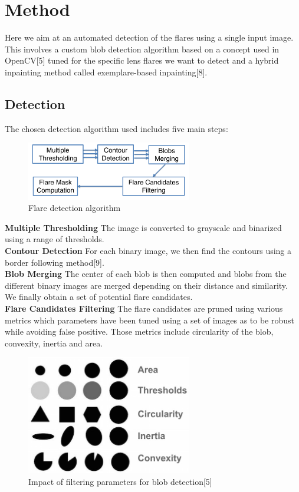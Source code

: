\documentclass[11pt,twocolumn]{article}
\begin{document}
\section{Method}

Here we aim at an automated detection of the flares using a single input image. This involves a custom blob detection algorithm based on a concept used in OpenCV[5] tuned for the specific lens flares we want to detect and a hybrid inpainting method called exemplare-based inpainting[8].

\subsection{Detection}

The chosen detection algorithm used includes five main steps:
\\

\begin{figure}[ht!]
\centering
\includegraphics[width=72mm]{flow_detection.png}
\caption{Flare detection algorithm}
\end{figure}

\textbf{Multiple Thresholding} The image is converted to grayscale and binarized using a range of thresholds.
\\

\textbf{Contour Detection} For each binary image, we then find the contours using a border following method[9].
\\

\textbf{Blob Merging} The center of each blob is then computed and blobs from the different binary images are merged depending on their distance and similarity. We finally obtain a set of potential flare candidates.
\\

\textbf{Flare Candidates Filtering} The flare candidates are pruned using various metrics which parameters have been tuned using a set of images as to be robust while avoiding false positive. Those metrics include circularity of the blob, convexity, inertia and area.

\begin{figure}[ht!]
\centering
\includegraphics[width=72mm]{Filters.jpg}
\caption{Impact of filtering parameters for blob detection[5]}
\end{figure} 
\end{document}
